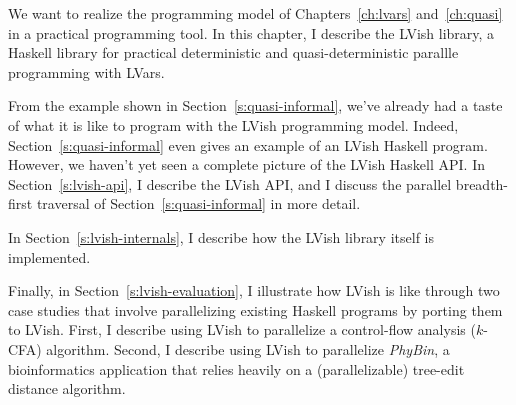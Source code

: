 
We want to realize the programming model of Chapters~\ref{ch:lvars}
and~\ref{ch:quasi} in a practical programming tool.  In this chapter,
I describe the LVish library, a Haskell library for practical
deterministic and quasi-deterministic parallle programming with LVars.

From the example shown in Section~\ref{s:quasi-informal}, we've
already had a taste of what it is like to program with the LVish
programming model.  Indeed, Section~\ref{s:quasi-informal} even gives
an example of an LVish Haskell program.  However, we haven't yet seen
a complete picture of the LVish Haskell API.  In
Section~\ref{s:lvish-api}, I describe the LVish API, and I discuss the
parallel breadth-first traversal of Section~\ref{s:quasi-informal} in
more detail.

In Section~\ref{s:lvish-internals}, I describe how the LVish library
itself is implemented.

Finally, in Section~\ref{s:lvish-evaluation}, I illustrate how LVish
is like through two case studies that involve parallelizing existing
Haskell programs by porting them to LVish.  First, I describe using
LVish to parallelize a control-flow analysis ($k$-CFA) algorithm.
Second, I describe using LVish to parallelize \emph{PhyBin}, a
bioinformatics application that relies heavily on a (parallelizable)
tree-edit distance algorithm.
